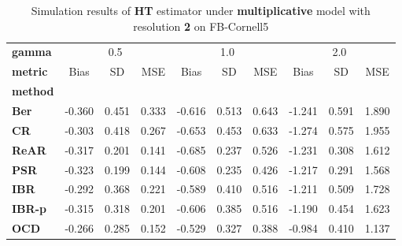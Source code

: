 \begin{table}
\centering
\caption{Simulation results of \textbf{HT} estimator under \textbf{multiplicative} model with resolution \textbf{2} on FB-Cornell5}
\begin{tabular}{lccccccccc}
\toprule
\textbf{gamma} & \multicolumn{3}{c}{0.5} & \multicolumn{3}{c}{1.0} & \multicolumn{3}{c}{2.0} \\
\textbf{metric} &   Bias &     SD &    MSE &   Bias &     SD &    MSE &   Bias &     SD &    MSE \\
\textbf{method} &        &        &        &        &        &        &        &        &        \\
\midrule
\textbf{Ber} & -0.360 &  0.451 &  0.333 & -0.616 &  0.513 &  0.643 & -1.241 &  0.591 &  1.890 \\
\textbf{CR} & -0.303 &  0.418 &  0.267 & -0.653 &  0.453 &  0.633 & -1.274 &  0.575 &  1.955 \\
\textbf{ReAR} & -0.317 &  0.201 &  0.141 & -0.685 &  0.237 &  0.526 & -1.231 &  0.308 &  1.612 \\
\textbf{PSR} & -0.323 &  0.199 &  0.144 & -0.608 &  0.235 &  0.426 & -1.217 &  0.291 &  1.568 \\
\textbf{IBR} & -0.292 &  0.368 &  0.221 & -0.589 &  0.410 &  0.516 & -1.211 &  0.509 &  1.728 \\
\textbf{IBR-p} & -0.315 &  0.318 &  0.201 & -0.606 &  0.385 &  0.516 & -1.190 &  0.454 &  1.623 \\
\textbf{OCD} & -0.266 &  0.285 &  0.152 & -0.529 &  0.327 &  0.388 & -0.984 &  0.410 &  1.137 \\
\bottomrule
\end{tabular}
\end{table}
